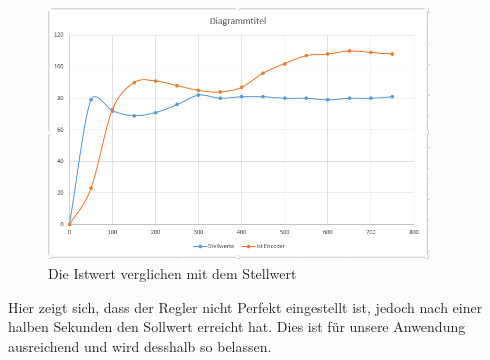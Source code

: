 \documentclass[a4paper, 10pt, fleqn]{article}
\begin{document}
\begin{figure}[H]%
\centering
\includegraphics[width=0.9\textwidth]{Images/PID auf 150mms.PNG}
\caption{Die Istwert verglichen mit dem Stellwert}
\label{fig:IstSollwertVergleich}
\end{figure}
Hier zeigt sich, dass der Regler nicht Perfekt eingestellt ist, jedoch nach einer halben Sekunden den Sollwert erreicht hat. Dies ist für unsere Anwendung ausreichend und wird desshalb so belassen.
\end{document}
